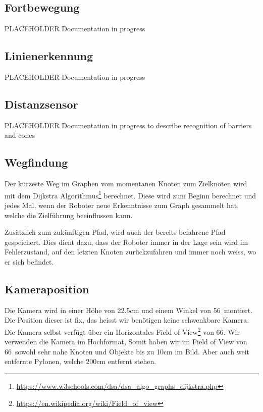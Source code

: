 \subsection{Fortbewegung}

PLACEHOLDER Documentation in progress

\subsection{Linienerkennung}

PLACEHOLDER Documentation in progress

\subsection{Distanzsensor}

PLACEHOLDER Documentation in progress to describe recognition of barriers and cones

\subsection{Wegfindung}

Der kürzeste Weg im Graphen vom momentanen Knoten zum Zielknoten wird mit dem Dijkstra Algorithmus\footnote{\url{https://www.w3schools.com/dsa/dsa\_algo\_graphs\_dijkstra.php}} berechnet. Diese wird zum Beginn berechnet und jedes Mal, wenn der Roboter neue Erkenntnisse zum Graph gesammelt hat, welche die Zielführung beeinflussen kann.

Zusätzlich zum zukünftigen Pfad, wird auch der bereits befahrene Pfad gespeichert. Dies dient dazu, dass der Roboter immer in der Lage sein wird im Fehlerzustand, auf den letzten Knoten zurückzufahren und immer noch weiss, wo er sich befindet.

\subsection{Kameraposition}

Die Kamera wird in einer Höhe von 22.5cm und einem Winkel von 56\textdegree\ montiert. Die Position dieser ist fix, das heisst wir benötigen keine schwenkbare Kamera.
Die Kamera selbst verfügt über ein Horizontales Field of View\footnote{\url{https://en.wikipedia.org/wiki/Field_of_view}} von 66\textdegree. Wir verwenden die Kamera im Hochformat, Somit haben wir im Field of View von 66\textdegree\ sowohl sehr nahe Knoten und Objekte bis zu 10cm im Bild. Aber auch weit entfernte Pylonen, welche 200cm entfernt stehen.

